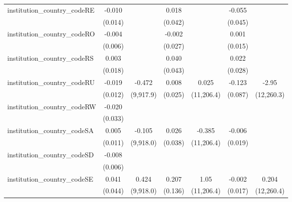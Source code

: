 \begin{tabular}{lcccccc}
   institution\_country\_codeRE          & -0.010         &               & 0.018         &              & -0.055       &   \\   
                                         & (0.014)        &               & (0.042)       &              & (0.045)      &   \\   
   institution\_country\_codeRO          & -0.004         &               & -0.002        &              & 0.001        &   \\   
                                         & (0.006)        &               & (0.027)       &              & (0.015)      &   \\   
   institution\_country\_codeRS          & 0.003          &               & 0.040         &              & 0.022        &   \\   
                                         & (0.018)        &               & (0.043)       &              & (0.028)      &   \\   
   institution\_country\_codeRU          & -0.019         & -0.472        & 0.008         & 0.025        & -0.123       & -2.95\\   
                                         & (0.012)        & (9,917.9)     & (0.025)       & (11,206.4)   & (0.087)      & (12,260.3)\\   
   institution\_country\_codeRW          & -0.020         &               &               &              &              &   \\   
                                         & (0.033)        &               &               &              &              &   \\   
   institution\_country\_codeSA          & 0.005          & -0.105        & 0.026         & -0.385       & -0.006       &   \\   
                                         & (0.011)        & (9,918.0)     & (0.038)       & (11,206.4)   & (0.019)      &   \\   
   institution\_country\_codeSD          & -0.008         &               &               &              &              &   \\   
                                         & (0.006)        &               &               &              &              &   \\   
   institution\_country\_codeSE          & 0.041          & 0.424         & 0.207         & 1.05         & -0.002       & 0.204\\   
                                         & (0.044)        & (9,918.0)     & (0.136)       & (11,206.4)   & (0.017)      & (12,260.4)\\   

\end{tabular}
